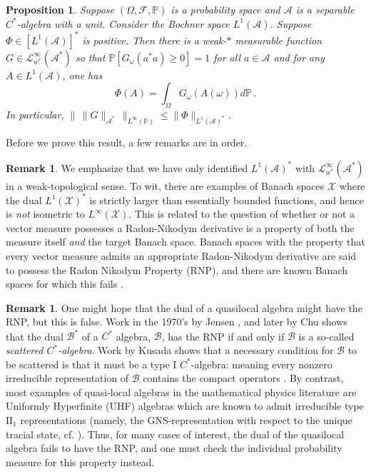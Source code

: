 \documentclass{article}
\newcommand{\A}{\mathcal{A}}
\newcommand{\B}{\mathcal{B}}
\renewcommand{\P}{\mathbb{P}}
\newcommand{\<}{\langle}
\renewcommand{\>}{\rangle}
\newtheorem{prop}[thm]{Proposition}
\theoremstyle{definition}
\newtheorem{rmk}[thm]{Remark}
\numberwithin{equation}{section}
\begin{document}
\begin{prop}\label{prop:w*RND}
	Suppose $(\Omega, \mathcal{F}, \P)$ is a probability space and $\A$ is a separable $C^*$-algebra with a unit. Consider the Bochner space $L^1(\A)$. Suppose $\Phi \in [L^1(\A)]^*$ is positive. Then there is a weak-$\ast$ measurable function $G\in \mathcal{L}^\infty_{w^*}(\A^*)$ so that $\P[G_\omega(a^*a) \ge 0] =1$ for all $a\in \A$ and for any $A\in L^1(\A)$, one has
	\begin{equation}\label{eqn:w*RND2}
		\Phi(A) = \int_\Omega G_\omega(A(\omega)) d\P\,.
	\end{equation} In particular, $\|\, \|G\|_{\A^*}\, \|_{L^\infty(\P)} \le \|\Phi\|_{L^1(\A)^*}$. 
\end{prop} 

Before we prove this result, a few remarks are in order. \begin{rmk}\label{rmk:RND_1}
    We emphasize that we have only identified $L^1(\A)^*$ with $\mathcal{L}^\infty_{w^*}(\A^*)$ in a weak-topological sense. To wit, there are examples of Banach spaces $\mathcal{X}$ where the dual $L^1(\mathcal{X})^*$ is strictly larger than essentially bounded functions, and hence is \emph{not} isometric to $L^\infty(\mathcal{X})$. This is related to the question of whether or not a vector measure possesses a Radon-Nikodym derivative is a property of both the measure itself \emph{and} the target Banach space. Banach spaces with the property that every vector measure admits an appropriate Radon-Nikodym derivative are said to possess the Radon Nikodym Property (RNP), and there are known Banach spaces for which this fails \cite{Ryan}.
\end{rmk}
\begin{rmk}\label{rmk:RND_2}
    One might hope that the dual of a quasilocal algebra might have the RNP, but this is false. Work in the 1970's by Jensen \cite{Jensen_I, Jensen_II}, and later by Chu \cite[Theorem 3]{Chu} shows that the dual $\B^*$ of a $C^*$ algebra, $\B$, has the RNP if and only if $\B$ is a so-called \emph{scattered $C^*$-algebra}. Work by Kusada \cite[Theorem 2.2]{Kusuda} shows that a necessary condition for $\B$ to be scattered is that it must be a type I $C^*$-algebra: meaning every nonzero irreducible representation of $\B$ contains the compact operators \cite[p. 169]{Murphy}. By contrast, most examples of quasi-local algebras in the mathematical physics literature are Uniformly Hyperfinite (UHF) algebras which are known to admit irreducible type $\mathrm{II}_1$ representations (namely, the GNS-representation with respect to the unique tracial state, cf. \cite[Theorem 11.2.2]{Anatharaman-DelarochePopa}). Thus, for many cases of interest, the dual of the quasilocal algebra fails to have the RNP, and one must check the individual probability measure for this property instead. 
 \end{rmk}
\end{document}
